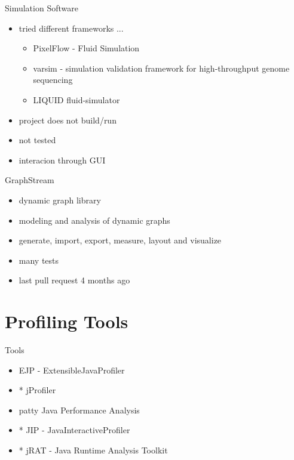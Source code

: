 \documentclass[11pt,aspectratio=169]{beamer}
\begin{document}
\begin{frame}{Simulation Software}
  \begin{itemize}
    \item tried different frameworks ...
    \begin{itemize}
      \item PixelFlow - Fluid Simulation
      \item varsim - simulation validation framework for high-throughput genome sequencing
      \item LIQUID fluid-simulator
    \end{itemize}
    \item project does not build/run
    \item not tested
    \item interacion through GUI
  \end{itemize}
\end{frame}

\begin{frame}{GraphStream}
  \begin{itemize}
    \item dynamic graph library
    \item modeling and analysis of dynamic graphs
    \item generate, import, export, measure, layout and visualize
    \item many tests
    \item last pull request 4 months ago
  \end{itemize}
\end{frame}

\section{Profiling Tools}

\begin{frame}{Tools}
  \begin{itemize}
    \item EJP - ExtensibleJavaProfiler
    \item * jProfiler
    \item patty Java Performance Analysis
    \item * JIP - JavaInteractiveProfiler
    \item * jRAT - Java Runtime Analysis Toolkit
  \end{itemize}
\end{frame}
\end{document}
